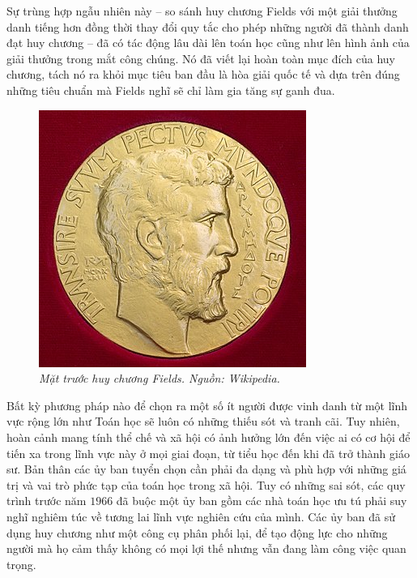 \begin{multicols}{2}
	\vskip 0.05cm
	Sự trùng hợp ngẫu nhiên này -- so sánh huy chương Fields với một giải thưởng danh tiếng hơn đồng thời thay đổi quy tắc cho phép những người đã thành danh đạt huy chương -- đã có tác động lâu dài lên toán học cũng như lên hình ảnh của giải thưởng trong mắt công chúng. Nó đã viết lại hoàn toàn mục đích của huy chương, tách nó ra khỏi mục tiêu ban đầu là hòa giải quốc tế và dựa trên đúng những tiêu chuẩn mà Fields nghĩ sẽ chỉ làm gia tăng sự ganh đua.
	\begin{figure}[H]
		\vspace*{-5pt}
		\centering
		\captionsetup{labelformat= empty, justification=centering}
		\includegraphics[width= 0.85\linewidth]{FieldsMedalFront}
		\caption{\small\textit{\color{lichsutoanhoc}Mặt trước huy chương Fields. Nguồn: Wikipedia.}}
		\vspace*{-10pt}
	\end{figure}
	Bất kỳ phương pháp nào để chọn ra một số ít người được vinh danh từ một lĩnh vực rộng lớn như Toán học sẽ luôn có những thiếu sót và tranh cãi. 
	Tuy nhiên, hoàn cảnh mang tính thể chế và xã hội có ảnh hưởng lớn đến việc ai có cơ hội để tiến xa trong lĩnh vực này ở mọi giai đoạn, từ tiểu học đến khi đã trở thành giáo sư. Bản thân các ủy ban tuyển chọn cần phải đa dạng và phù hợp với những giá trị và vai trò phức tạp của toán học trong xã hội. 
	\vskip 0.05cm
	Tuy có những sai sót, các quy trình trước năm $1966$ đã buộc một ủy ban gồm các nhà toán học ưu tú phải suy nghĩ nghiêm túc về tương lai lĩnh vực nghiên cứu của mình. Các ủy ban đã sử dụng huy chương như một công cụ phân phối lại, để tạo động lực cho những người mà họ cảm thấy không có mọi lợi thế nhưng vẫn đang làm công việc quan trọng.

\end{multicols}
